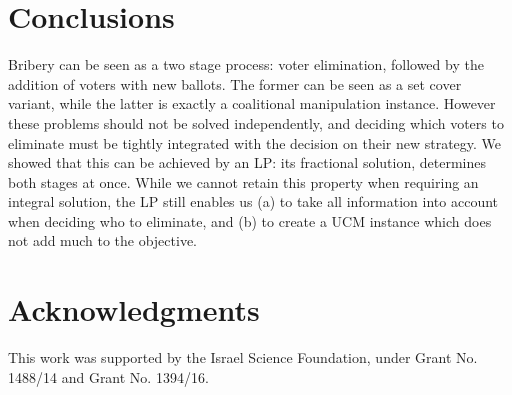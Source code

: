 \documentclass[letterpaper]{article} %
\theoremstyle{definition}
\begin{document}
\section{Conclusions}
Bribery can be seen as a two stage process: voter elimination, followed by the addition of voters with new ballots. The former can be seen as a set cover variant, while the latter is exactly a coalitional manipulation instance. However these problems should not be solved independently, and deciding which voters to eliminate must be tightly integrated with the decision on their new strategy. We showed that this can be achieved by an LP: its fractional solution, determines both stages at once. While we cannot retain this property when requiring an integral solution, the LP still enables us (a) to take all information into account when deciding who to eliminate, and (b) to create a UCM instance which does not add much to the objective.

\section{Acknowledgments}
	This work was supported by the Israel Science Foundation, under Grant No. 1488/14 and Grant No. 1394/16.


 
	




	
\end{document}
